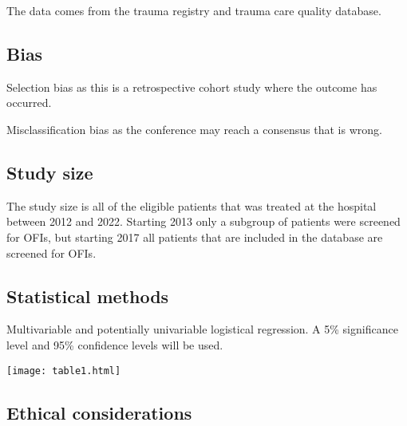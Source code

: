 \documentclass[
]{article}
\begin{document}
The data comes from the trauma registry and trauma care quality
database.

\hypertarget{bias}{%
\subsection{Bias}\label{bias}}

Selection bias as this is a retrospective cohort study where the outcome
has occurred.

Misclassification bias as the conference may reach a consensus that is
wrong.

\hypertarget{study-size}{%
\subsection{Study size}\label{study-size}}

The study size is all of the eligible patients that was treated at the
hospital between 2012 and 2022. Starting 2013 only a subgroup of
patients were screened for OFIs, but starting 2017 all patients that are
included in the database are screened for OFIs.

\hypertarget{statistical-methods}{%
\subsection{Statistical methods}\label{statistical-methods}}

Multivariable and potentially univariable logistical regression. A 5\%
significance level and 95\% confidence levels will be used.

\texttt{[image: table1.html]}

\hypertarget{ethical-considerations}{%
\subsection*{Ethical considerations}\label{ethical-considerations}}
\end{document}
